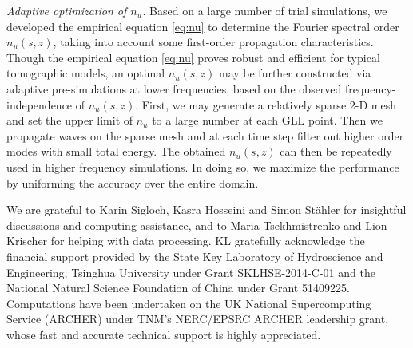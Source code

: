 \documentclass[extra,referee]{gji}
\begin{document}
\textit{Adaptive optimization of $n_u$.}
Based on a large number of trial simulations, we developed
the empirical equation \eqref{eq:nu} to determine the 
Fourier spectral order $n_u\left(s,z\right)$, taking into account some 
first-order propagation characteristics.
Though the empirical equation \eqref{eq:nu} proves robust and efficient
for typical tomographic models, an optimal $n_u\left(s,z\right)$ may be further 
constructed via adaptive pre-simulations at lower frequencies, based on 
the observed frequency-independence of $n_u\left(s,z\right)$. 
First, we may generate a relatively sparse 2-D mesh and set the upper 
limit of $n_u$ to a large number at each GLL point. Then we 
propagate waves on the sparse mesh and at each time step filter out higher
order modes with small total energy. The obtained 
$n_u\left(s,z\right)$ can then be repeatedly used in higher frequency simulations. 
In doing so, we maximize the performance by uniforming the accuracy over
the entire domain. 






\begin{acknowledgments}
We are grateful to Karin Sigloch, Kasra Hosseini and Simon St\"ahler 
for insightful discussions and computing assistance, and to 
Maria Tsekhmistrenko and Lion Krischer for helping with data processing.
KL gratefully acknowledge the financial support
provided by the State Key Laboratory of Hydroscience and Engineering,
Tsinghua University under Grant SKLHSE-2014-C-01 and 
the National Natural Science Foundation of China under Grant 51409225.
Computations have been undertaken on the UK National Supercomputing Service 
(ARCHER) under TNM's NERC/EPSRC ARCHER leadership grant,
whose fast and accurate technical support is highly appreciated. 
\end{acknowledgments}
\end{document}
